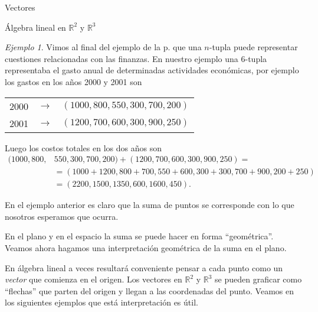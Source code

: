 \documentclass[a4paper,12pt,twoside,spanish,reqno]{amsbook}
\numberwithin{equation}{section}
\theoremstyle{definition}
\theoremstyle{remark}
\newtheorem*{ejemplo*}{Ejemplo}
\newcommand{\R}{\mathbb R}
\begin{document}
\begin{chapter}{Vectores}
\begin{section}{Álgebra lineal en $\R^2$ y $\R^3$}
    \begin{ejemplo*} 
        Vimos al final del ejemplo de la p. \pageref{ej-3espacio-industria} que una $n$-tupla puede representar cuestiones relacionadas con las finanzas. En  nuestro ejemplo una 6-tupla representaba el gasto anual de determinadas actividades económicas, por ejemplo los gastos  en los años 2000 y 2001 son 
        \begin{center}
            \begin{tabular}{lcl}
                2000 \quad&$\rightarrow$\quad &$(1000, 800, 550, 300, 700, 200)$ \\
                2001 \quad&$\rightarrow$\quad &$(1200, 700, 600, 300, 900, 250)$ 
            \end{tabular} 
        \end{center}
        Luego los costos totales en los dos años son 
        \begin{align*}
            (1000, 800,& 550, 300, 700, 200) + (1200, 700, 600, 300, 900, 250) = \\
            &=(1000+1200, 800+700, 550+600, 300+300, 700+900, 200+250) \\
            &= (2200, 1500, 1350, 600, 1600, 450). 
        \end{align*} 
    \end{ejemplo*}
    
    
    En  el ejemplo anterior es claro que la suma de puntos se corresponde con lo que nosotros esperamos que ocurra. 
    
    En  el plano y en el espacio la suma se puede hacer en  forma ``geométrica''. Veamos ahora hagamos una interpretación geométrica de la suma  en el plano.
    
    En  álgebra lineal a veces resultará  conveniente pensar a cada punto como un {\em vector} que comienza en el origen.  Los vectores en  $\R^2$ y $\R^3$ se pueden graficar como ``flechas'' que parten del origen y llegan a las coordenadas del punto. Veamos en los siguientes ejemplos que está interpretación es útil. 
    

\end{section}
\end{chapter}
\end{document}
